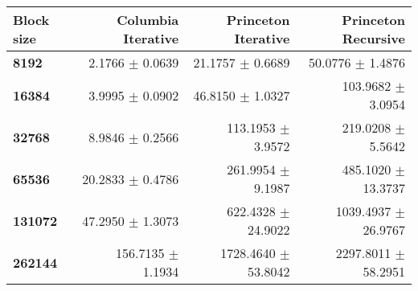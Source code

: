 \begin{tabular}{lrrr}\toprule
\textbf{Block size}  & \textbf{Columbia Iterative} & \textbf{Princeton Iterative} & \textbf{Princeton Recursive}\\\midrule
\textbf{8192}  & 2.1766 $\pm$ 0.0639 & 21.1757 $\pm$ 0.6689 & 50.0776 $\pm$ 1.4876\\
\textbf{16384}  & 3.9995 $\pm$ 0.0902 & 46.8150 $\pm$ 1.0327 & 103.9682 $\pm$ 3.0954\\
\textbf{32768}  & 8.9846 $\pm$ 0.2566 & 113.1953 $\pm$ 3.9572 & 219.0208 $\pm$ 5.5642\\
\textbf{65536}  & 20.2833 $\pm$ 0.4786 & 261.9954 $\pm$ 9.1987 & 485.1020 $\pm$ 13.3737\\
\textbf{131072}  & 47.2950 $\pm$ 1.3073 & 622.4328 $\pm$ 24.9022 & 1039.4937 $\pm$ 26.9767\\
\textbf{262144} & 156.7135 $\pm$ 1.1934 & 1728.4640 $\pm$ 53.8042 & 2297.8011 $\pm$ 58.2951\\
\bottomrule
\end{tabular}
